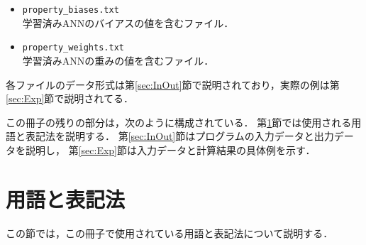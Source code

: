 \documentclass[11pt, titlepage, dvipdfmx, twoside]{jarticle}
\begin{document}
\begin{itemize}
\begin{itemize}
\begin{itemize}
\item {\tt property\_biases.txt}\\
学習済みANNのバイアスの値を含むファイル．

\item {\tt property\_weights.txt}\\
学習済みANNの重みの値を含むファイル．
\end{itemize}
%
各ファイルのデータ形式は第\ref{sec:InOut}節で説明されており，実際の例は第\ref{sec:Exp}節で説明されてる．

% 
%
\end{itemize}
\end{itemize}



この冊子の残りの部分は，次のように構成されている．
第\ref{sec:Pre}節では使用される用語と表記法を説明する．
%
第\ref{sec:InOut}節はプログラムの入力データと出力データを説明し，
第\ref{sec:Exp}節は入力データと計算結果の具体例を示す．


\section{用語と表記法}
\label{sec:Pre}
%
この節では，この冊子で使用されている用語と表記法について説明する．
\end{document}
